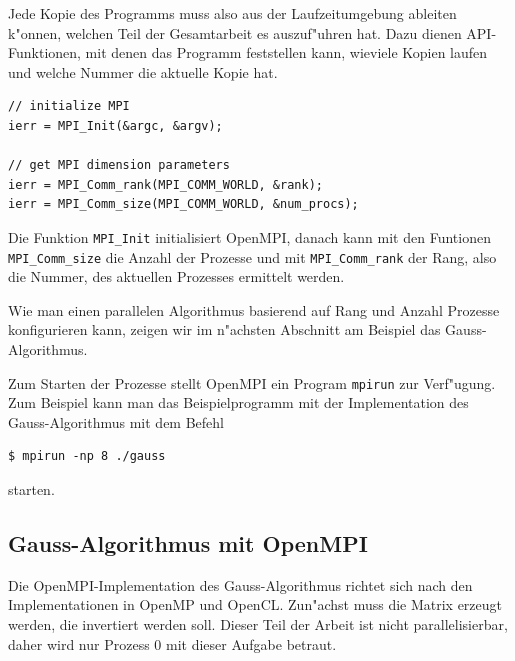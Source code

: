 Jede Kopie des Programms muss also aus der Laufzeitumgebung
ableiten k"onnen, welchen Teil der Gesamtarbeit es auszuf"uhren hat.
Dazu dienen API-Funktionen, mit denen das Programm feststellen kann,
wieviele Kopien laufen und welche Nummer die aktuelle Kopie hat.
\begin{verbatim}
// initialize MPI
ierr = MPI_Init(&argc, &argv);

// get MPI dimension parameters
ierr = MPI_Comm_rank(MPI_COMM_WORLD, &rank);
ierr = MPI_Comm_size(MPI_COMM_WORLD, &num_procs);
\end{verbatim}
Die Funktion \verb+MPI_Init+ initialisiert OpenMPI, danach kann mit
den Funtionen \verb+MPI_Comm_size+ die Anzahl der Prozesse und mit
\verb+MPI_Comm_rank+ der Rang, also die Nummer, des aktuellen Prozesses
ermittelt werden.

Wie man einen parallelen Algorithmus basierend auf Rang und Anzahl
Prozesse konfigurieren kann, zeigen wir im n"achsten Abschnitt am
Beispiel das Gauss-Algorithmus.

Zum Starten der Prozesse stellt OpenMPI ein Program \verb+mpirun+
zur Verf"ugung. Zum Beispiel kann man das Beispielprogramm mit der
Implementation des Gauss-Algorithmus mit dem Befehl
\begin{verbatim}
$ mpirun -np 8 ./gauss 
\end{verbatim}
starten.

\subsection{Gauss-Algorithmus mit OpenMPI}
Die OpenMPI-Implementation des Gauss-Algorithmus richtet sich nach
den Implementationen in OpenMP und OpenCL.
Zun"achst muss die Matrix erzeugt werden, die invertiert werden soll.
Dieser Teil der Arbeit ist nicht parallelisierbar, daher wird nur Prozess 0
mit dieser Aufgabe betraut.

